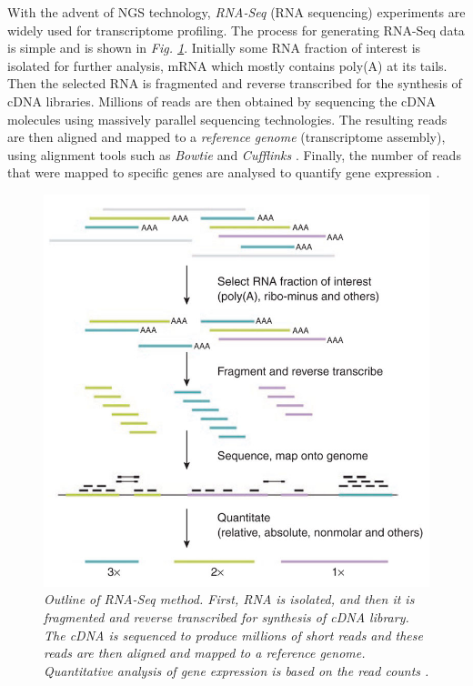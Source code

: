 With the advent of NGS technology, \emph{RNA-Seq} (RNA sequencing) \citep{Wang2009} experiments are widely used for transcriptome profiling. The process for generating RNA-Seq data is simple and is shown in \emph{Fig. \ref{rnaSeq-pic}}. Initially some RNA fraction of interest is isolated for further analysis, \eg mRNA which mostly contains poly(A) at its tails. Then the selected RNA is fragmented and reverse transcribed for the synthesis of cDNA libraries. Millions of reads are then obtained by sequencing the cDNA molecules using massively parallel sequencing technologies. The resulting reads are then aligned and mapped to a \emph{reference genome} (\ie transcriptome assembly), using alignment tools such as \emph{Bowtie} \citep{Langmead2009} and \emph{Cufflinks} \citep{Trapnell2010}. Finally, the number of reads that were mapped to specific genes are analysed to quantify gene expression \citep{Pepke2009}.  
\begin{figure}[!ht]
\begin{center}
 \includegraphics[scale = 0.45]{images/rna-seq}
\caption{\emph{Outline of RNA-Seq method. First, RNA is isolated, and then it is fragmented and reverse transcribed for synthesis of cDNA library. The cDNA is sequenced to produce millions of short reads and these reads are then aligned and mapped to a reference genome. Quantitative analysis of gene expression is based on the read counts \citep{Pepke2009}.}}
\label{rnaSeq-pic}
\end{center}
\end{figure} 